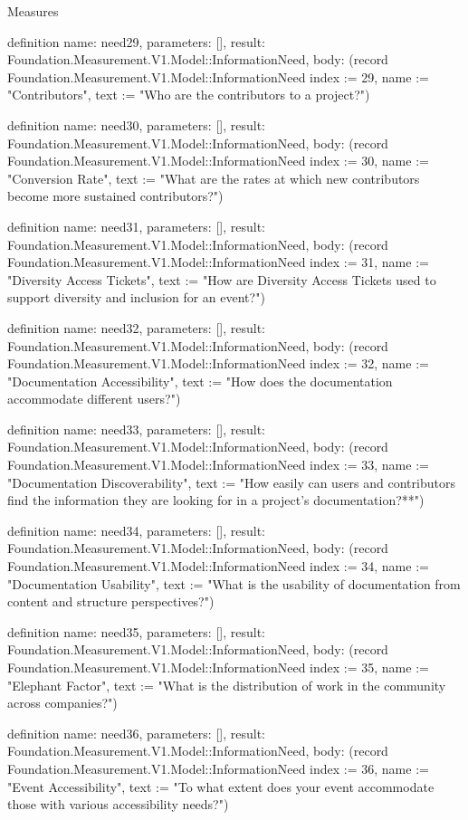 \begin{lexlean}{Measures}
\begin{semanticmodule}
definition{
  name: need29,
  parameters: [],
  result: Foundation.Measurement.V1.Model::InformationNeed,
  body: (record Foundation.Measurement.V1.Model::InformationNeed {index := 29, name := "Contributors", text := "Who are the contributors to a project?"})
}

definition{
  name: need30,
  parameters: [],
  result: Foundation.Measurement.V1.Model::InformationNeed,
  body: (record Foundation.Measurement.V1.Model::InformationNeed {index := 30, name := "Conversion Rate", text := "What are the rates at which new contributors become more sustained contributors?"})
}

definition{
  name: need31,
  parameters: [],
  result: Foundation.Measurement.V1.Model::InformationNeed,
  body: (record Foundation.Measurement.V1.Model::InformationNeed {index := 31, name := "Diversity Access Tickets", text := "How are Diversity Access Tickets used to support diversity and inclusion for an event?"})
}

definition{
  name: need32,
  parameters: [],
  result: Foundation.Measurement.V1.Model::InformationNeed,
  body: (record Foundation.Measurement.V1.Model::InformationNeed {index := 32, name := "Documentation Accessibility", text := "How does the documentation accommodate different users?"})
}

definition{
  name: need33,
  parameters: [],
  result: Foundation.Measurement.V1.Model::InformationNeed,
  body: (record Foundation.Measurement.V1.Model::InformationNeed {index := 33, name := "Documentation Discoverability", text := "How easily can users and contributors find the information they are looking for in a project’s documentation?**"})
}

definition{
  name: need34,
  parameters: [],
  result: Foundation.Measurement.V1.Model::InformationNeed,
  body: (record Foundation.Measurement.V1.Model::InformationNeed {index := 34, name := "Documentation Usability", text := "What is the usability of documentation from content and structure perspectives?"})
}

definition{
  name: need35,
  parameters: [],
  result: Foundation.Measurement.V1.Model::InformationNeed,
  body: (record Foundation.Measurement.V1.Model::InformationNeed {index := 35, name := "Elephant Factor", text := "What is the distribution of work in the community across companies?"})
}

definition{
  name: need36,
  parameters: [],
  result: Foundation.Measurement.V1.Model::InformationNeed,
  body: (record Foundation.Measurement.V1.Model::InformationNeed {index := 36, name := "Event Accessibility", text := "To what extent does your event accommodate those with various accessibility needs?"})
}


\end{semanticmodule}
\end{lexlean}
